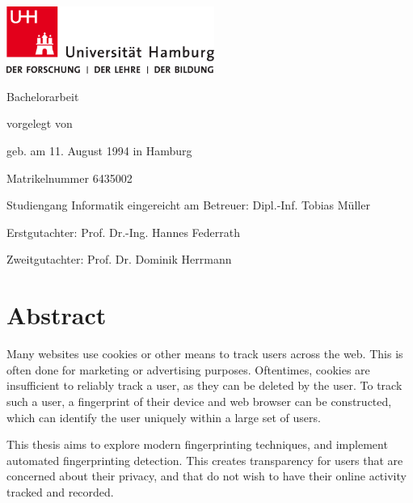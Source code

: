 \documentclass[
    fontsize=12pt,
    headings=small,
    parskip=half,
    bibliography=totoc,
    numbers=noenddot,
    open=any
    ]{scrreprt}
\begin{document}
\newpage
\thispagestyle{empty}
\begin{titlepage}%
\includegraphics[width=6.8cm]{images/up-uhh-logo-u-2010-u-farbe-u-rgb.pdf}
\begin{center}\Large
	\vfill
	Bachelorarbeit
	\vfill
	\makeatletter
	{\Large\textsf{\textbf{\@title}}\par}
	\makeatother
	\vfill
	vorgelegt von
	\par\bigskip
	\makeatletter
	{\@author} \par
	\makeatother
	geb. am 11. August 1994 in Hamburg \par
	Matrikelnummer 6435002 \par
	Studiengang Informatik
	\vfill
	\makeatletter
	eingereicht am {\@date}
	\makeatother
	\vfill
	Betreuer: Dipl.-Inf. Tobias Müller \par
	Erstgutachter: Prof. Dr.-Ing. Hannes Federrath \par
	Zweitgutachter: Prof. Dr. Dominik Herrmann
\end{center}
\end{titlepage}%

\null\newpage

\chapter*{Abstract}

Many websites use cookies or other means to track users across the web. This is often
done for marketing or advertising purposes. Oftentimes, cookies are insufficient to reliably
track a user, as they can be deleted by the user. To track such a user, a fingerprint
of their device and web browser can be constructed, which can identify the user uniquely
within a large set of users.

This thesis aims to explore modern fingerprinting techniques, and implement
automated fingerprinting detection. This creates transparency for users
that are concerned about their privacy, and that do not wish to have their online
activity tracked and recorded.
\end{document}
